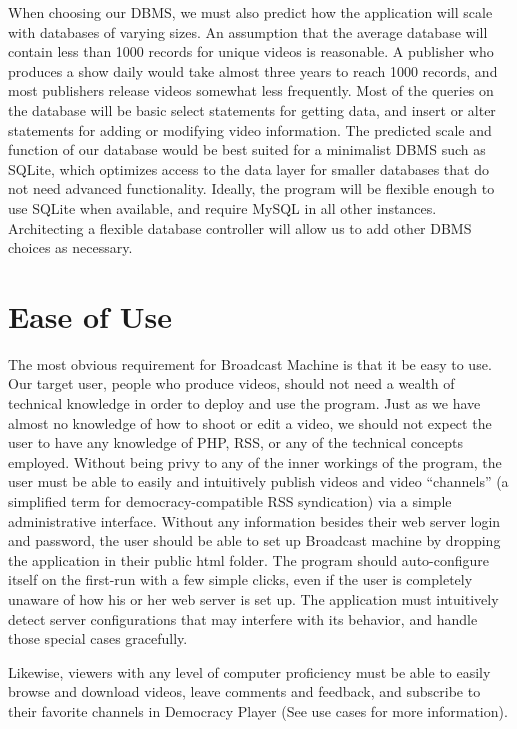 \documentclass[a4paper,12pt]{report}
\begin{document}
When choosing our DBMS, we must also predict how the application will scale with databases of varying sizes. An assumption that the average database will contain less than 1000 records for unique videos is reasonable. A publisher who produces a show daily would take almost three years to reach 1000 records, and most publishers release videos somewhat less frequently. Most of the queries on the database will be basic select statements for getting data, and insert or alter statements for adding or modifying video information. The predicted scale and function of our database would be best suited for a minimalist DBMS such as SQLite, which optimizes access to the data layer for smaller databases that do not need advanced functionality. Ideally, the program will be flexible enough to use SQLite when available, and require MySQL in all other instances. Architecting a flexible database controller will allow us to add other DBMS choices as necessary.

\section{Ease of Use}

	The most obvious requirement for Broadcast Machine is that it be easy to use. Our target user, people who produce videos, should not need a wealth of technical knowledge in order to deploy and use the program. Just as we have almost no knowledge of how to shoot or edit a video, we should not expect the user to have any knowledge of PHP, RSS, or any of the technical concepts employed. Without being privy to any of the inner workings of the program, the user must be able to easily and intuitively publish videos and video “channels” (a simplified term for democracy-compatible RSS syndication) via a simple administrative interface. Without any information besides their web server login and password, the user should be able to set up Broadcast machine by dropping the application in their public html folder. The program should auto-configure itself on the first-run with a few simple clicks, even if the user is completely unaware of how his or her web server is set up. The application must intuitively detect server configurations that may interfere with its behavior, and handle those special cases gracefully.

Likewise, viewers with any level of computer proficiency must be able to easily browse and download videos, leave comments and feedback, and subscribe to their favorite channels in Democracy Player (See use cases for more information).
\end{document}
